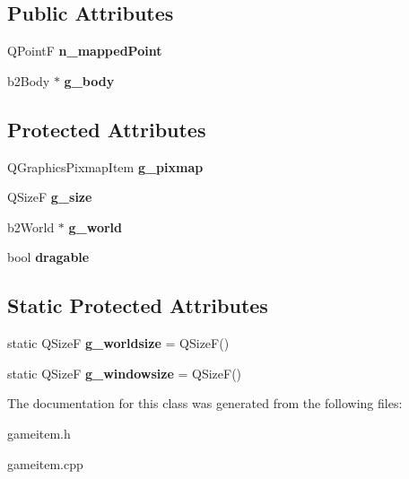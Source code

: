 \subsection*{Public Attributes}
\begin{DoxyCompactItemize}
\item 
\hypertarget{classGameItem_a3ee0fcf85f92718f1baaa3b76419c2fb}{Q\-Point\-F {\bfseries n\-\_\-mapped\-Point}}\label{classGameItem_a3ee0fcf85f92718f1baaa3b76419c2fb}

\item 
\hypertarget{classGameItem_aa021d911802e721b49270fe790d5e605}{b2\-Body $\ast$ {\bfseries g\-\_\-body}}\label{classGameItem_aa021d911802e721b49270fe790d5e605}

\end{DoxyCompactItemize}
\subsection*{Protected Attributes}
\begin{DoxyCompactItemize}
\item 
\hypertarget{classGameItem_ae01ffe4691dbeef8e2b89949061688ae}{Q\-Graphics\-Pixmap\-Item {\bfseries g\-\_\-pixmap}}\label{classGameItem_ae01ffe4691dbeef8e2b89949061688ae}

\item 
\hypertarget{classGameItem_a7d359356b75422daf7589718358a53f0}{Q\-Size\-F {\bfseries g\-\_\-size}}\label{classGameItem_a7d359356b75422daf7589718358a53f0}

\item 
\hypertarget{classGameItem_a4eea6373f6df167a191100826fa0c151}{b2\-World $\ast$ {\bfseries g\-\_\-world}}\label{classGameItem_a4eea6373f6df167a191100826fa0c151}

\item 
\hypertarget{classGameItem_a3794162e832b8b7779a3dd5a61e62d9d}{bool {\bfseries dragable}}\label{classGameItem_a3794162e832b8b7779a3dd5a61e62d9d}

\end{DoxyCompactItemize}
\subsection*{Static Protected Attributes}
\begin{DoxyCompactItemize}
\item 
\hypertarget{classGameItem_afc553cb4c7c10569dd0fc54e49173e95}{static Q\-Size\-F {\bfseries g\-\_\-worldsize} = Q\-Size\-F()}\label{classGameItem_afc553cb4c7c10569dd0fc54e49173e95}

\item 
\hypertarget{classGameItem_a32623c6e1c31a1a3976bb717c1782a86}{static Q\-Size\-F {\bfseries g\-\_\-windowsize} = Q\-Size\-F()}\label{classGameItem_a32623c6e1c31a1a3976bb717c1782a86}

\end{DoxyCompactItemize}


The documentation for this class was generated from the following files\-:\begin{DoxyCompactItemize}
\item 
gameitem.\-h\item 
gameitem.\-cpp\end{DoxyCompactItemize}
